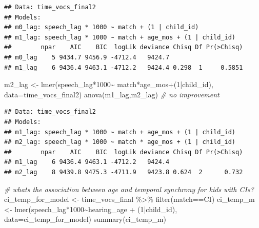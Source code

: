 \documentclass[
]{article}
\newenvironment{Shaded}{\begin{snugshade}}{\end{snugshade}}
\newcommand{\AttributeTok}[1]{\textcolor[rgb]{0.77,0.63,0.00}{#1}}
\newcommand{\CommentTok}[1]{\textcolor[rgb]{0.56,0.35,0.01}{\textit{#1}}}
\newcommand{\DecValTok}[1]{\textcolor[rgb]{0.00,0.00,0.81}{#1}}
\newcommand{\FunctionTok}[1]{\textcolor[rgb]{0.00,0.00,0.00}{#1}}
\newcommand{\NormalTok}[1]{#1}
\newcommand{\OtherTok}[1]{\textcolor[rgb]{0.56,0.35,0.01}{#1}}
\newcommand{\SpecialCharTok}[1]{\textcolor[rgb]{0.00,0.00,0.00}{#1}}
\newcommand{\StringTok}[1]{\textcolor[rgb]{0.31,0.60,0.02}{#1}}
\begin{document}
\begin{verbatim}
## Data: time_vocs_final2
## Models:
## m0_lag: speech_lag * 1000 ~ match + (1 | child_id)
## m1_lag: speech_lag * 1000 ~ match + age_mos + (1 | child_id)
##        npar    AIC    BIC  logLik deviance Chisq Df Pr(>Chisq)
## m0_lag    5 9434.7 9456.9 -4712.4   9424.7                    
## m1_lag    6 9436.4 9463.1 -4712.2   9424.4 0.298  1     0.5851
\end{verbatim}

\begin{Shaded}
\begin{Highlighting}[]
\NormalTok{m2\_lag }\OtherTok{\textless{}{-}} \FunctionTok{lmer}\NormalTok{(speech\_lag}\SpecialCharTok{*}\DecValTok{1000}\SpecialCharTok{\textasciitilde{}}\NormalTok{ match}\SpecialCharTok{*}\NormalTok{age\_mos}\SpecialCharTok{+}\NormalTok{(}\DecValTok{1}\SpecialCharTok{|}\NormalTok{child\_id), }\AttributeTok{data=}\NormalTok{time\_vocs\_final2)}
\FunctionTok{anova}\NormalTok{(m1\_lag,m2\_lag) }\CommentTok{\# no improvement }
\end{Highlighting}
\end{Shaded}

\begin{verbatim}
## Data: time_vocs_final2
## Models:
## m1_lag: speech_lag * 1000 ~ match + age_mos + (1 | child_id)
## m2_lag: speech_lag * 1000 ~ match * age_mos + (1 | child_id)
##        npar    AIC    BIC  logLik deviance Chisq Df Pr(>Chisq)
## m1_lag    6 9436.4 9463.1 -4712.2   9424.4                    
## m2_lag    8 9439.8 9475.3 -4711.9   9423.8 0.624  2      0.732
\end{verbatim}

\begin{Shaded}
\begin{Highlighting}[]
\CommentTok{\# what\textquotesingle{}s the association between age and temporal synchrony for kids with CIs?}
\NormalTok{ci\_temp\_for\_model }\OtherTok{\textless{}{-}}\NormalTok{ time\_vocs\_final }\SpecialCharTok{\%\textgreater{}\%} \FunctionTok{filter}\NormalTok{(match}\SpecialCharTok{==}\StringTok{\textquotesingle{}CI\textquotesingle{}}\NormalTok{)}
\NormalTok{ci\_temp\_m }\OtherTok{\textless{}{-}} \FunctionTok{lmer}\NormalTok{(speech\_lag}\SpecialCharTok{*}\DecValTok{1000}\SpecialCharTok{\textasciitilde{}}\NormalTok{hearing\_age }\SpecialCharTok{+}\NormalTok{ (}\DecValTok{1}\SpecialCharTok{|}\NormalTok{child\_id), }\AttributeTok{data=}\NormalTok{ci\_temp\_for\_model)}
\FunctionTok{summary}\NormalTok{(ci\_temp\_m)}
\end{Highlighting}
\end{Shaded}
\end{document}
